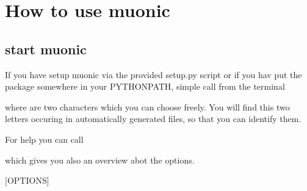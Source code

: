 \documentclass[letterpaper,10pt,english]{sphinxmanual}
\begin{document}
\section{How to use muonic}
\label{tutorial::doc}\label{tutorial:how-to-use-muonic}

\subsection{start muonic}
\label{tutorial:start-muonic}
If you have setup muonic via the provided setup.py script or if you hav put the package somewhere in your PYTHONPATH, simple call from the terminal


where  are two characters which you can choose freely. You will find this two letters occuring in automatically generated files, so that you can identify them.

For help you can call


which gives you also an overview abot the options.

{[}OPTIONS{]}

\begin{fulllineitems}
\label{tutorial:cmdoption-muonic-s}
\end{fulllineitems}


\begin{fulllineitems}
\label{tutorial:cmdoption-muonic-d}
\end{fulllineitems}


\begin{fulllineitems}
\label{tutorial:cmdoption-muonic-t}
\end{fulllineitems}
\end{document}
